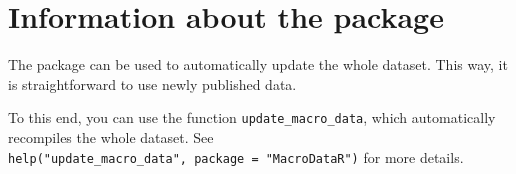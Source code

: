 \documentclass[]{article}
\begin{document}
\section{Information about the
package}\label{information-about-the-package}

The package can be used to automatically update the whole dataset. This
way, it is straightforward to use newly published data.

To this end, you can use the function \texttt{update\_macro\_data},
which automatically recompiles the whole dataset. See
\texttt{help("update\_macro\_data",\ package\ =\ "MacroDataR")} for more
details.
\end{document}
